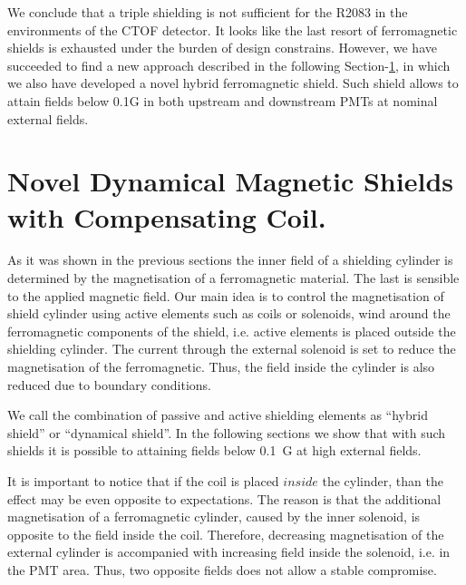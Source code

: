 \documentclass[12pt]{article}
\begin{document}
\clearpage
We conclude that  a  triple shielding  is  not  
sufficient for the R2083 in the environments of the CTOF detector.
It looks like  the last resort of ferromagnetic shields is  exhausted  under the 
burden of design constrains.
However, we have succeeded to  find a new  approach described in the 
following Section-\ref{novelle}, in which we also  
have  developed a novel  hybrid ferromagnetic shield. 
Such shield allows  to attain fields below 0.1G in both  upstream and
downstream PMTs at nominal external fields.
\pagebreak
\newpage
\section{Novel Dynamical Magnetic Shields with Compensating Coil.}
\label{novelle}
As it was shown in the previous sections the inner field of a shielding cylinder
is determined by the   magnetisation  of a ferromagnetic material.  The last   is  sensible to
the applied magnetic field.
Our main idea is to control the magnetisation of shield cylinder
using active elements such as coils or solenoids, wind  around the 
ferromagnetic components of the shield, i.e. active elements is placed outside the 
shielding cylinder.  The current through the external solenoid  is set to 
reduce the  magnetisation of the ferromagnetic. Thus, the field inside the cylinder 
is also reduced due to  boundary conditions.

We call the  combination  of passive  and active shielding elements  as ``hybrid shield'' or 
``dynamical shield''. In the following sections  we show that with such shields  it is possible to  
attaining fields below 0.1~G at high external fields.

It is important to notice that if the coil is placed $inside$ the cylinder, 
than the  effect may be even opposite to expectations. The reason is that the   
additional   magnetisation of a ferromagnetic cylinder,  caused by  the inner solenoid, 
is opposite to the field inside the coil. 
Therefore, decreasing magnetisation of the external  cylinder is accompanied with increasing field inside the
solenoid, i.e. in the PMT area.  Thus, two opposite fields  does not allow a stable compromise.
 
\end{document}
